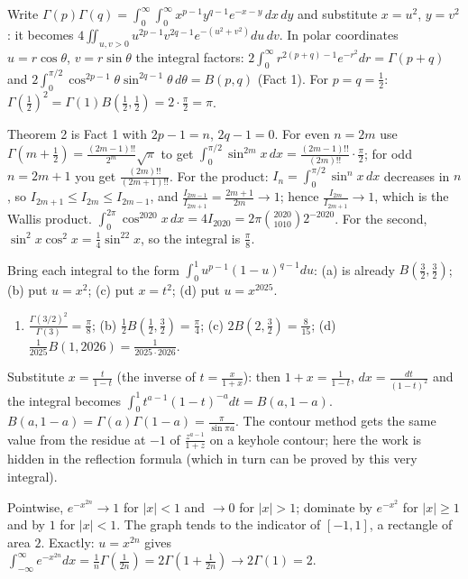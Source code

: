\documentclass[11pt,a4paper]{article}
\begin{document}

Write \(\Gamma(p)\Gamma(q)=\int_0^\infty\int_0^\infty x^{p-1}y^{q-1}e^{-x-y}\,dx\,dy\) and substitute \(x=u^2\), \(y=v^2\): it becomes \(4\iint_{u,v\gt0}u^{2p-1}v^{2q-1}e^{-(u^2+v^2)}du\,dv\).
In polar coordinates \(u=r\cos\theta\), \(v=r\sin\theta\) the integral factors: \(2\int_0^\infty r^{2(p+q)-1}e^{-r^2}dr=\Gamma(p+q)\) and \(2\int_0^{\pi/2}\cos^{2p-1}\theta\sin^{2q-1}\theta\,d\theta=B(p,q)\) (Fact 1). For \(p=q=\frac12\): \(\Gamma(\frac12)^2=\Gamma(1)B(\frac12,\frac12)=2\cdot\frac\pi2=\pi\).

Theorem 2 is Fact 1 with \(2p-1=n\), \(2q-1=0\). For even \(n=2m\) use \(\Gamma(m+\frac12)=\frac{(2m-1)!!}{2^m}\sqrt\pi\) to get \(\int_0^{\pi/2}\sin^{2m}x\,dx=\frac{(2m-1)!!}{(2m)!!}\cdot\frac\pi2\); for odd \(n=2m+1\) you get \(\frac{(2m)!!}{(2m+1)!!}\).
For the product: \(I_n=\int_0^{\pi/2}\sin^nx\,dx\) decreases in \(n\), so \(I_{2m+1}\le I_{2m}\le I_{2m-1}\), and \(\frac{I_{2m-1}}{I_{2m+1}}=\frac{2m+1}{2m}\to1\); hence \(\frac{I_{2m}}{I_{2m+1}}\to1\), which is the Wallis product.
\(\int_0^{2\pi}\cos^{2020}x\,dx=4I_{2020}=2\pi\binom{2020}{1010}2^{-2020}\). For the second, \(\sin^2x\cos^2x=\frac14\sin^22x\), so the integral is \(\frac\pi8\).

Bring each integral to the form \(\int_0^1u^{p-1}(1-u)^{q-1}du\): (a) is already \(B(\frac32,\frac32)\); (b) put \(u=x^2\); (c) put \(x=t^2\); (d) put \(u=x^{2025}\).
\begin{enumerate}
\def\labelenumi{(\alph{enumi})}
\tightlist
\item
  \(\frac{\Gamma(3/2)^2}{\Gamma(3)}=\frac\pi8\); (b) \(\frac12B(\frac12,\frac32)=\frac\pi4\); (c) \(2B(2,\frac32)=\frac8{15}\); (d) \(\frac1{2025}B(1,2026)=\frac1{2025\cdot2026}\).
\end{enumerate}

Substitute \(x=\frac{t}{1-t}\) (the inverse of \(t=\frac x{1+x}\)): then \(1+x=\frac1{1-t}\), \(dx=\frac{dt}{(1-t)^2}\) and the integral becomes \(\int_0^1t^{a-1}(1-t)^{-a}dt=B(a,1-a)\).
\(B(a,1-a)=\Gamma(a)\Gamma(1-a)=\frac\pi{\sin\pi a}\). The contour method gets the same value from the residue at \(-1\) of \(\frac{z^{a-1}}{1+z}\) on a keyhole contour; here the work is hidden in the reflection formula (which in turn can be proved by this very integral).

Pointwise, \(e^{-x^{2n}}\to1\) for \(\lvert x\rvert\lt1\) and \(\to0\) for \(\lvert x\rvert\gt1\); dominate by \(e^{-x^2}\) for \(\lvert x\rvert\ge1\) and by \(1\) for \(\lvert x\rvert\lt1\). The graph tends to the indicator of \([-1,1]\), a rectangle of area \(2\).
Exactly: \(u=x^{2n}\) gives \(\int_{-\infty}^\infty e^{-x^{2n}}dx=\frac1n\Gamma\left(\frac1{2n}\right)=2\Gamma\left(1+\frac1{2n}\right)\to2\Gamma(1)=2\).
\end{document}
